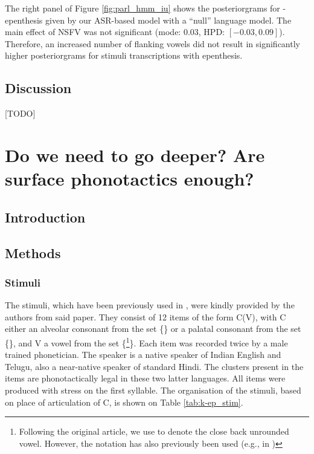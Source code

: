 {%
The right panel of Figure \ref{fig:parl_hmm_iu} shows the posteriorgrams for -epenthesis given by our ASR-based model with a ``null'' language model.
The main effect of \textsc{NSFV} was not significant (mode: $0.03$, HPD: $[-0.03, 0.09]$). Therefore, an increased number of  flanking vowels did not result in significantly higher posteriorgrams for stimuli transcriptions with  epenthesis.

\subsection{Discussion}
{\color{red}[TODO]}


\newpage
\section{{\color{red}Do we need to go deeper? Are surface phonotactics enough?}} \label{3-k-epenth}
\subsection{Introduction}
\subsection{Methods}
\subsubsection{Stimuli}

The stimuli, which have been previously used in \cite{durvasula2015}, were kindly provided by the authors from said paper. They consist of 12 items of the form C(V), with \textsc{C} either an alveolar consonant from the set \{\} or a palatal consonant from the set \{\}, and \textsc{V} a vowel from the set \{\footnote{Following the original article, we use \textipa{[1]} to denote the close back unrounded vowel. However, the notation \textipa{[W]} has also previously been used (e.g., in \cite{kabak2007})}\}.
Each item was recorded twice by a male trained phonetician. The speaker is a native speaker of Indian English and Telugu, also a near-native speaker of standard Hindi. The clusters present in the items are phonotactically legal in these two latter languages. All items were produced with stress on the first syllable.
The organisation of the stimuli, based on place of articulation of \textsc{C}, is shown on Table \ref{tab:k-ep_stim}.

}
